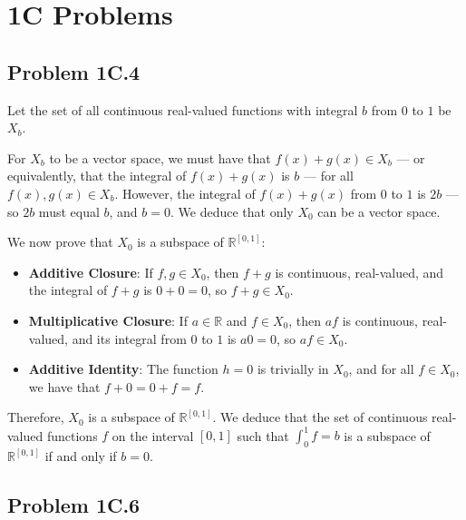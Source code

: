 \documentclass[11pt]{article}
\begin{document}

\section{1C Problems}

\subsection{Problem 1C.4}

Let the set of all continuous real-valued functions with integral $b$ from $0$ to $1$ be $X_{b}$.

For $X_{b}$ to be a vector space, we must have that $f(x) + g(x) \in X_{b}$ --- or equivalently, that the integral of $f(x) + g(x)$ is $b$ --- for all $f(x), g(x) \in X_{b}$. However, the integral of $f(x) + g(x)$ from $0$ to $1$ is $2b$ --- so $2b$ must equal $b$, and $b = 0$. We deduce that only $X_{0}$ can be a vector space.

\newpage

We now prove that $X_{0}$ is a subspace of $\mathbb{R}^{[0, 1]}$: 
\begin{itemize}
	\item \textbf{Additive Closure}: If $f, g \in X_{0}$, then $f + g$ is continuous, real-valued, and the integral of $f + g$ is $0 + 0 = 0$, so $f + g \in X_{0}$.
	\item \textbf{Multiplicative Closure}: If $a \in \mathbb{R}$ and $f \in X_{0}$, then $af$ is continuous, real-valued, and its integral from $0$ to $1$ is $a0 = 0$, so $af \in X_{0}$.
	\item \textbf{Additive Identity}: The function $h = 0$ is trivially in $X_{0}$, and for all $f \in X_{0}$, we have that $f + 0 = 0 + f = f$.
\end{itemize}
Therefore, $X_{0}$ is a subspace of $\mathbb{R}^{[0, 1]}$. We deduce that the set of continuous real-valued functions $f$ on the interval $[0, 1]$ such that $\int_{0}^{1} f = b$ is a subspace of $\mathbb{R}^{[0, 1]}$ if and only if $b = 0$.

\subsection{Problem 1C.6}
\end{document}
